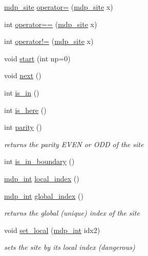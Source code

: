 \begin{DoxyCompactItemize}
\item 
\hyperlink{classmdp__site}{mdp\_\-site} \hyperlink{classmdp__site_aee55a3c862cb667839be5febd37b1791}{operator=} (\hyperlink{classmdp__site}{mdp\_\-site} x)
\item 
int \hyperlink{classmdp__site_a171afa9aeee40776c4ee8405fba525aa}{operator==} (\hyperlink{classmdp__site}{mdp\_\-site} x)
\item 
int \hyperlink{classmdp__site_af393fef955cb91629ece72746a582236}{operator!=} (\hyperlink{classmdp__site}{mdp\_\-site} x)
\item 
void \hyperlink{classmdp__site_a67f09ac8f2c14dc4461120244443532e}{start} (int np=0)
\item 
void \hyperlink{classmdp__site_a19445777d77aaf38ff3bd15d48c7c683}{next} ()
\item 
int \hyperlink{classmdp__site_a57ff5d47780a90ad36c9368360ad2d89}{is\_\-in} ()
\item 
int \hyperlink{classmdp__site_a1457471b74c722514712f1efb1093f63}{is\_\-here} ()
\item 
int \hyperlink{classmdp__site_a0b36dc1179dac2b0737dda900f135194}{parity} ()
\begin{DoxyCompactList}\small\item\em returns the parity EVEN or ODD of the site \item\end{DoxyCompactList}\item 
int \hyperlink{classmdp__site_a57188578cccbd53d6ff5ef5b791d32a4}{is\_\-in\_\-boundary} ()
\item 
\hyperlink{mdp__global__vars_8h_aaa1ad9d0dcd2124aa5af0120d9954174}{mdp\_\-int} \hyperlink{classmdp__site_a4a19d418044e9bf5e285998676df6f43}{local\_\-index} ()
\item 
\hyperlink{mdp__global__vars_8h_aaa1ad9d0dcd2124aa5af0120d9954174}{mdp\_\-int} \hyperlink{classmdp__site_aff34724d521041f255daf4fad09a0408}{global\_\-index} ()
\begin{DoxyCompactList}\small\item\em returns the global (unique) index of the site \item\end{DoxyCompactList}\item 
void \hyperlink{classmdp__site_a9545484331e101ce177d0877df305cbe}{set\_\-local} (\hyperlink{mdp__global__vars_8h_aaa1ad9d0dcd2124aa5af0120d9954174}{mdp\_\-int} idx2)
\begin{DoxyCompactList}\small\item\em sets the site by its local index (dangerous) \item\end{DoxyCompactList}\item 

\end{DoxyCompactItemize}
